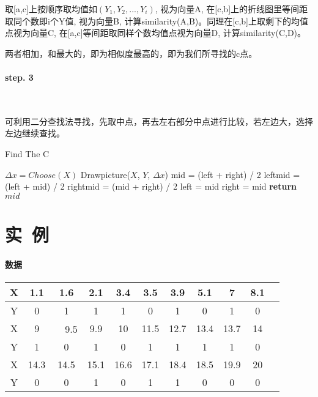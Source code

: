 \documentclass{article}
\begin{document}
		取[a,c]上按顺序取均值如$(Y_1,Y_2,...,Y_i)$, 视为向量A, 在[c,b]上的折线图里等间距取同个数即i个Y值, 视为向量B, 计算similarity(A,B)。同理在[c,b]上取剩下的均值点视为向量C, 在[a,c]等间距取同样个数均值点视为向量D, 计算similarity(C,D)。
		
		两者相加，和最大的，即为相似度最高的，即为我们所寻找的c点。
		
		\paragraph{step. 3}\
		
		可利用二分查找法寻找，先取中点，再去左右部分中点进行比较，若左边大，选择左边继续查找。
		
		\begin{algorithm}
			\caption{Find The C}
			\begin{algorithmic}
				\State $\Delta x = Choose(X)$
				\State Drawpicture($X$, $Y$, $\Delta x$)
				\State mid = (left + right) / 2
				\State leftmid = (left + mid) / 2
				\State rightmid = (mid + right) / 2
				\State left = mid
				\Else
				\State right = mid
				\EndIf
				\EndWhile
				\State \textbf{return} $mid$
				\EndProcedure
			\end{algorithmic}
		\end{algorithm}
	\section{实\ 例}
		\paragraph{数据}
		\begin{center}
			\begin{tabular}{|c||c|c|c|c|c|c|c|c|c|c|}
				\hline
				X & 1.1 & 1.6 & 2.1 & 3.4 & 3.5 & 3.9 & 5.1 & 7 & 8.1\\
				\hline
				Y & 0 & 1 & 1 & 1 & 0 & 1 & 0 & 1 & 0\\
				\hline
				X & 9 &　9.5 & 9.9 & 10 & 11.5 & 12.7 & 13.4 & 13.7 & 14\\
				\hline
				Y & 1 & 0 & 1 & 0 & 1 & 1 & 1 & 1 & 0\\
				\hline
				X & 14.3 & 14.5 & 15.1 & 16.6 & 17.1 & 18.4 & 18.5 & 19.9 & 20\\
				\hline
				Y & 0 & 0 & 1 & 0 & 1 & 1 & 0 & 0 & 0\\
				\hline
			\end{tabular}\\[1em]
		\end{center}
	
\end{document}
